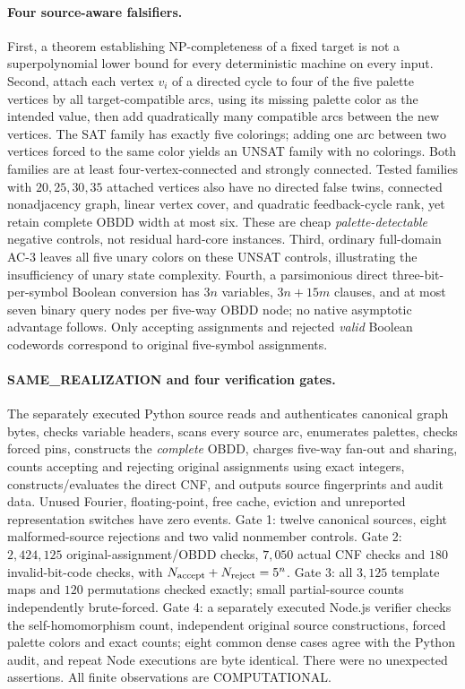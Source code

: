 \documentclass[11pt]{article}
\begin{document}
\paragraph{Four source-aware falsifiers.}
First, a theorem establishing NP-completeness of a fixed
target is not a superpolynomial lower bound for every
deterministic machine on every input. Second, attach each
vertex $v_i$ of a directed cycle to four of the five
palette vertices by all target-compatible arcs, using its
missing palette color as the intended value, then add
quadratically many compatible arcs between the new
vertices. The SAT family has exactly five colorings;
adding one arc between two vertices forced to the same
color yields an UNSAT family with no colorings. Both
families are at least four-vertex-connected and strongly
connected. Tested families with $20,25,30,35$ attached
vertices also have no directed false twins, connected
nonadjacency graph, linear vertex cover, and quadratic
feedback-cycle rank, yet retain complete OBDD width
at most six. These are cheap \emph{palette-detectable}
negative controls, not residual hard-core instances.
Third, ordinary full-domain AC-3 leaves all five
unary colors on these UNSAT controls, illustrating
the insufficiency of unary state complexity.
Fourth, a parsimonious direct three-bit-per-symbol
Boolean conversion has $3n$ variables,
$3n+15m$ clauses, and at most seven binary query
nodes per five-way OBDD node; no native asymptotic
advantage follows. Only accepting assignments
and rejected \emph{valid} Boolean codewords correspond
to original five-symbol assignments.

\paragraph{SAME\_REALIZATION and four verification gates.}
The separately executed Python source reads and
authenticates canonical graph bytes, checks variable
headers, scans every source arc, enumerates palettes,
checks forced pins, constructs the \emph{complete} OBDD,
charges five-way fan-out and sharing, counts accepting
and rejecting original assignments using exact
integers, constructs/evaluates the direct CNF, and
outputs source fingerprints and audit data. Unused
Fourier, floating-point, free cache, eviction and
unreported representation switches have zero events.
Gate 1: twelve canonical sources, eight malformed-source
rejections and two valid nonmember controls.
Gate 2: $2{,}424{,}125$ original-assignment/OBDD checks,
$7{,}050$ actual CNF checks and $180$ invalid-bit-code
checks, with $N_{\rm accept}+N_{\rm reject}=5^n$.
Gate 3: all $3{,}125$ template maps and $120$
permutations checked exactly; small partial-source
counts independently brute-forced.
Gate 4: a separately executed Node.js verifier checks
the self-homomorphism count, independent original
source constructions, forced palette colors and exact
counts; eight common dense cases agree with the
Python audit, and repeat Node executions are byte
identical. There were no unexpected assertions.
All finite observations are COMPUTATIONAL.
\end{document}

